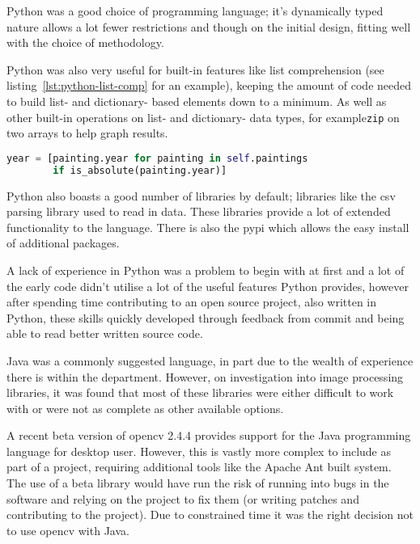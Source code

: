 Python was a good choice of programming language; it's dynamically typed nature allows a lot fewer
restrictions and though on the initial design, fitting well with the choice of methodology. 

Python was also very useful for built-in features like list comprehension (see 
listing~\ref{lst:python-list-comp} for an example), keeping the amount of code needed to build 
list- and dictionary- based elements down to a minimum. As well as other built-in operations on 
list- and dictionary- data types, for example\texttt{zip} on two arrays to help graph results.

\begin{lstlisting}[language=python,
caption={Example of List Comprehension in Python},
label=lst:python-list-comp]
year = [painting.year for painting in self.paintings 
        if is_absolute(painting.year)]
\end{lstlisting}

Python also boasts a good number of libraries by default; libraries like the \gls{csv} parsing 
library used to read in data. These libraries provide a lot of extended functionality to the 
language. There is also the \gls{pypi} which allows the easy install of 
additional packages.

A lack of experience in Python was a problem to begin with at first and a lot of the early code 
didn't utilise a lot of the useful features Python provides, however after spending time 
contributing to an open source project, also written in Python, these skills quickly developed 
through feedback from commit and being able to read better written source code.

Java was a commonly suggested language, in part due to the wealth of experience there is within
the department. However, on investigation into image processing libraries, it was found that most
of these libraries were either difficult to work with or were not as complete as other available
options.

A recent beta version of \gls{opencv} 2.4.4 provides support for the Java programming language
for desktop user. However, this is vastly more complex to include as part of a project, requiring
additional tools like the Apache Ant built system. The use of a beta library would have run the 
risk of running into bugs in the software and relying on the project to fix them (or writing 
patches and contributing to the project). Due to constrained time it was the right decision not to
use \gls{opencv} with Java.

